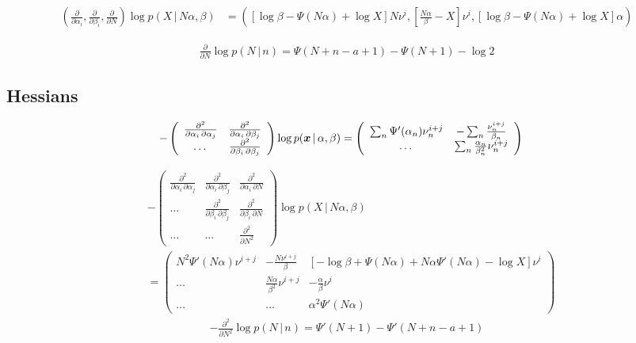\documentclass[11pt]{article}
\newcommand{\cond}{\,|\,}
\newcommand{\firstDeriv}[1]{\frac{\partial}{\partial #1}}
\newcommand{\secDeriv}[1]{\frac{\partial^2}{\partial #1^2}} %
\newcommand{\secPartial}[2]{\frac{\partial^2}{\partial #1 \, \partial #2}} %
\begin{document}
\begin{align}
  \label{eq:grad-prediction}
  \left( \firstDeriv{\alpha_i}, \firstDeriv{\beta_i}, \firstDeriv{N} \right) \log p(X \cond N \alpha, \beta)  &=
  \left(
    \left[ \log \beta - \Psi(N \alpha) + \log X \right] N \nu^i,
    \left[ \frac{N\alpha}{\beta} - X \right]\nu^i,
    \left[ \log \beta -\Psi(N \alpha) + \log X \right] \alpha
  \right)
\end{align}

\begin{align}
  \label{eq:grad-nb}
  \firstDeriv{N} \log p(N \cond n) = \Psi(N+n-a+1) - \Psi(N+1) - \log 2
\end{align}

\subsection{Hessians} \label{sec:hessians}

\begin{align}
  \label{eq:hess-posterior}
    - \left(
    \begin{array}{ccc}
      \secPartial{\alpha_i}{\alpha_j} & \secPartial{\alpha_i}{\beta_j}\\
      \dots & \secPartial{\beta_i}{\beta_j}
    \end{array}
  \right) \log p(\bmx \cond \alpha, \beta)
    &= \left(
    \begin{array}{cc}
      \sum_n \Psi'(\alpha_n) \nu_n^{i+j} & -\sum_n \frac{\nu_n^{i+j}}{\beta_n}\\
      \dots & \sum_n \frac{\alpha_n}{\beta_n^2} \nu_n^{i+j}
    \end{array}
  \right)
\end{align}

 \begin{align}
  \label{eq:hess-prediction}
  & - \left(
    \begin{array}{ccc}
      \secPartial{\alpha_i}{\alpha_j} & \secPartial{\alpha_i}{\beta_j} & \secPartial{\alpha_i}{N}\\
      \dots & \secPartial{\beta_i}{\beta_j} & \secPartial{\beta_i}{N}\\
      \dots & \dots & \secDeriv{N}
    \end{array}
  \right) \log p(X \cond N \alpha, \beta)
  \\
  &=
  \left(
    \begin{array}{ccc}
      N^2 \Psi'(N \alpha) \nu^{i+j} & -\frac{N \nu^{i+j}}{\beta} & \left[ -\log \beta +\Psi(N \alpha) + N \alpha \Psi'(N \alpha) - \log X \right] \nu^{i}\\
      \dots &  \frac{N\alpha}{\beta^2} \nu^{i+j} & -\frac{\alpha}{\beta} \nu^{i} \\
      \dots & \dots & \alpha^2 \Psi'(N \alpha)
    \end{array}
  \right)
\end{align}
\begin{align}
  \label{eq:hess-nb}
   - \secDeriv{N} \log p(N \cond n) = \Psi'(N+1) - \Psi'(N+n-a+1)
\end{align}



\end{document}
